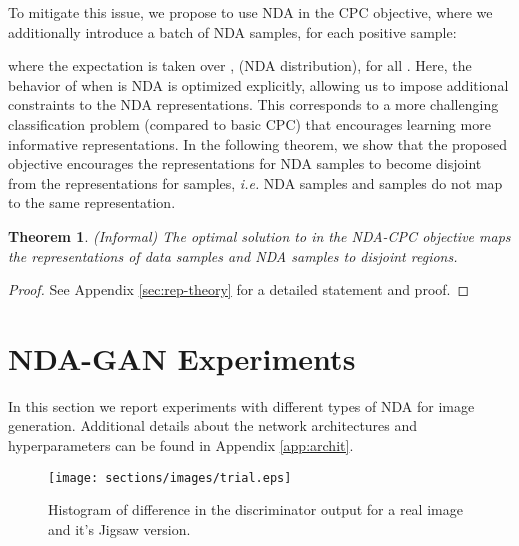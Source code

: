 \documentclass{article} \usepackage{iclr2021_conference,times}
\newtheorem{theorem}{Theorem}
\begin{document}
To mitigate this issue, we propose to use NDA in the CPC objective, where we additionally introduce a batch of NDA samples, for each positive sample:

where the expectation is taken over ,  (NDA distribution),  for all . 
    Here, the behavior of  when  is NDA is optimized explicitly, allowing us to impose additional constraints to the NDA representations. This corresponds to a more challenging classification problem (compared to basic CPC) that encourages learning more informative representations.
In the following theorem, we show that the proposed objective encourages the representations for NDA samples to become disjoint from the representations for  samples, \textit{i.e.} NDA samples and  samples do not map to the same representation. 



\begin{theorem}
\label{thm:cpc-informal}
(Informal) The optimal solution to  in the NDA-CPC objective maps the representations of data samples and NDA samples to disjoint regions.
\end{theorem}
\begin{proof}
See Appendix \ref{sec:rep-theory} for a detailed statement and proof.
\end{proof}














 



\section{NDA-GAN Experiments}
In this section we report experiments with different types of NDA for image generation. Additional details about the network architectures and hyperparameters can be found in Appendix \ref{app:archit}.

\begin{wrapfigure}{r}{0.30\textwidth}
\vspace{-20pt}
  \begin{center}
    \texttt{[image: sections/images/trial.eps]}
  \end{center}
  \vspace{-10pt}
  \caption{Histogram of difference in the discriminator output for a real image and it's Jigsaw version.}
  \vspace{-5pt}
  \label{fig:diff}
\end{wrapfigure}
\end{document}
